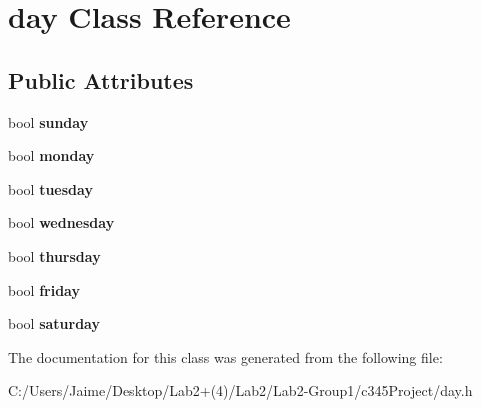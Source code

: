 \hypertarget{classday}{
\section{day Class Reference}
\label{classday}
}
\subsection*{Public Attributes}
\begin{DoxyCompactItemize}
\item 
\hypertarget{classday_ab0c00d47f123c2210aa959653f358de0}{
bool {\bfseries sunday}}
\label{classday_ab0c00d47f123c2210aa959653f358de0}

\item 
\hypertarget{classday_a64bae830cf3d73effd00e81ae0b8fc08}{
bool {\bfseries monday}}
\label{classday_a64bae830cf3d73effd00e81ae0b8fc08}

\item 
\hypertarget{classday_a0c97c1337f20695aba29d10ef7e1306f}{
bool {\bfseries tuesday}}
\label{classday_a0c97c1337f20695aba29d10ef7e1306f}

\item 
\hypertarget{classday_aca880a972698aa714b2769009d1b83bf}{
bool {\bfseries wednesday}}
\label{classday_aca880a972698aa714b2769009d1b83bf}

\item 
\hypertarget{classday_a9bcc66317253298989621429f7f233ce}{
bool {\bfseries thursday}}
\label{classday_a9bcc66317253298989621429f7f233ce}

\item 
\hypertarget{classday_afa4b75b8968e16a91e9bde57e98a4390}{
bool {\bfseries friday}}
\label{classday_afa4b75b8968e16a91e9bde57e98a4390}

\item 
\hypertarget{classday_a24c21b63a0c587b02651972ad6663f42}{
bool {\bfseries saturday}}
\label{classday_a24c21b63a0c587b02651972ad6663f42}

\end{DoxyCompactItemize}


The documentation for this class was generated from the following file:\begin{DoxyCompactItemize}
\item 
C:/Users/Jaime/Desktop/Lab2+(4)/Lab2/Lab2-\/Group1/c345Project/day.h\end{DoxyCompactItemize}
